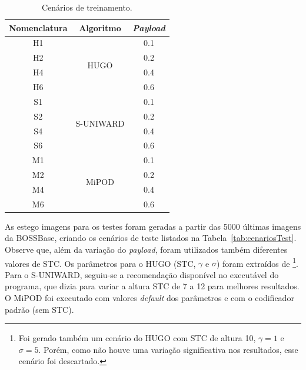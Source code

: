 \begin{table}[!htb]
\centering
\caption{Cenários de treinamento.}
\label{tab:cenariosTrain}
\begin{tabular}{|c|c|c|}
\hline
Nomenclatura& Algoritmo & \textit{Payload}\\ \hline
H1 & \multirow{4}{*}{HUGO} & 0.1 \\ \cline{1-1} \cline{3-3} 
H2 &                   &  0.2\\ \cline{1-1} \cline{3-3} 
H4 &                   &  0.4\\ \cline{1-1} \cline{3-3} 
H6 &                   &  0.6\\ \hline
S1 & \multirow{4}{*}{S-UNIWARD} & 0.1 \\ \cline{1-1} \cline{3-3} 
S2 &                   &  0.2\\ \cline{1-1} \cline{3-3} 
S4 &                   &  0.4\\ \cline{1-1} \cline{3-3} 
S6 &                   &  0.6\\ \hline
M1 & \multirow{4}{*}{MiPOD} & 0.1 \\ \cline{1-1} \cline{3-3} 
M2 &                   & 0.2 \\ \cline{1-1} \cline{3-3} 
M4 &                   &  0.4\\ \cline{1-1} \cline{3-3} 
M6 &                   &  0.6\\ \hline
\end{tabular}
\end{table}
As estego imagens para os testes foram geradas a partir das 5000 últimas imagens da BOSSBase, criando os cenários de teste listados na Tabela~\ref{tab:cenariosTest}. Observe que, além da variação do \textit{payload}, foram utilizados também diferentes valores de STC. %
Os parâmetros para o HUGO (STC, $\gamma$ e $\sigma$) foram extraídos de \footnote{Foi gerado também um cenário do HUGO com STC de altura 10, $\gamma = 1$ e $\sigma = 5$. Porém, como não houve uma variação significativa nos resultados, esse cenário foi descartado.}. Para o S-UNIWARD, seguiu-se a recomendação disponível no executável do programa, que dizia para variar a altura STC de 7 a 12 para melhores resultados. O MiPOD foi executado com valores \textit{default} dos parâmetros e com o codificador padrão (sem STC).


